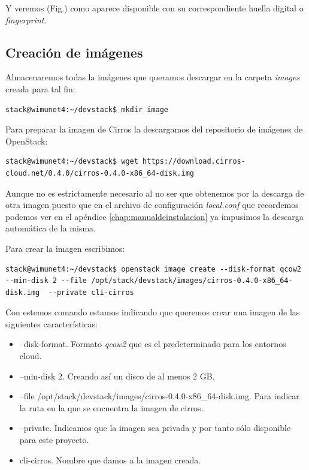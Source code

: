 Y veremos (Fig.) como aparece disponible con su correspondiente huella digital o \textit{fingerprint}.


\subsection{Creación de imágenes}
Almacenaremos todas la imágenes que queramos descargar en la carpeta \textit{images} creada para tal fin:

\begin{lstlisting}[style=Consola]
stack@wimunet4:~/devstack$ mkdir image
\end{lstlisting}

Para preparar la imagen de Cirros la descargamos del repositorio de imágenes de OpenStack:

\begin{lstlisting}[style=Consola]
stack@wimunet4:~/devstack$ wget https://download.cirros-cloud.net/0.4.0/cirros-0.4.0-x86_64-disk.img
\end{lstlisting}

Aunque no es estrictamente necesario al no ser que obtenemos por la descarga de otra imagen puesto que en el archivo de configuración \textit{local.conf} que recordemos podemos ver en el apéndice \ref{chap:manualdeinstalacion} ya impusimos la descarga automática de la misma.

Para crear la imagen escribimos:

\begin{lstlisting}[style=Consola]
stack@wimunet4:~/devstack$ openstack image create --disk-format qcow2 --min-disk 2 --file /opt/stack/devstack/images/cirros-0.4.0-x86_64-disk.img  --private cli-cirros
\end{lstlisting}

Con estemos comando estamos indicando que queremos crear una imagen de las siguientes características:
\begin{itemize}
\item --disk-format. Formato \textit{qcow2} que es el predeterminado para los entornos cloud.
\item --min-disk 2. Creando así un disco de al menos 2 GB.
\item --file /opt/stack/devstack/images/cirros-0.4.0-x86\_64-disk.img. Para indicar la ruta en la que se encuentra la imagen de cirros.
\item --private. Indicamos que la imagen sea privada y por tanto sólo disponible para este proyecto.
\item cli-cirros. Nombre que damos a la imagen creada.
\end{itemize}

